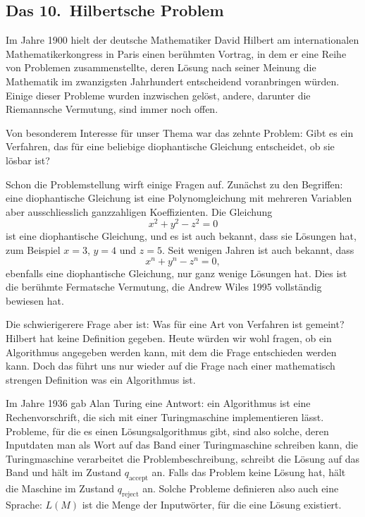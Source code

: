 \subsection{Das 10.~Hilbertsche Problem}
%
%
Im Jahre 1900 hielt der deutsche Mathematiker David Hilbert am
%
internationalen Mathematikerkongress in Paris einen berühmten Vortrag,
in dem er eine Reihe von Problemen zusammenstellte, deren Lösung
nach seiner Meinung die Mathematik im zwanzigsten Jahrhundert
entscheidend voranbringen würden. Einige dieser Probleme wurden
inzwischen gelöst, andere, darunter die Riemannsche Vermutung,
sind immer noch offen.

Von besonderem Interesse für unser Thema war das zehnte Problem:
Gibt es ein Verfahren, das für eine beliebige diophantische Gleichung
entscheidet, ob sie lösbar ist?

Schon die Problemstellung wirft einige Fragen auf.
Zunächst zu den Begriffen:
%
eine diophantische Gleichung ist eine
Polynomgleichung mit mehreren Variablen aber ausschliesslich
ganzzahligen Koeffizienten. Die Gleichung
\[
x^2+y^2-z^2=0
\]
ist eine diophantische Gleichung, und es ist auch bekannt, dass sie
Lösungen hat, zum Beispiel $x=3$, $y=4$ und $z=5$. Seit wenigen
Jahren ist auch bekannt, dass
\[
x^n+y^n-z^n=0,
\]
ebenfalls eine diophantische Gleichung, nur ganz wenige Lösungen hat.
Dies ist die berühmte Fermatsche Vermutung, die Andrew Wiles 1995
%
%
vollständig bewiesen hat.

Die schwierigerere Frage aber ist: Was für eine Art von Verfahren
ist gemeint? Hilbert hat keine Definition gegeben. Heute würden
wir wohl fragen, ob ein Algorithmus angegeben werden kann, mit dem
die Frage entschieden werden kann. Doch das führt uns nur wieder
auf die Frage nach einer  mathematisch strengen Definition was
ein Algorithmus ist.

%
Im Jahre 1936 gab Alan Turing eine Antwort: ein Algorithmus ist eine
Rechenvorschrift, die sich mit einer Turingmaschine implementieren
lässt. Probleme, für die es einen Lösungsalgorithmus gibt, sind
also solche, deren Inputdaten man als Wort auf das Band einer
Turingmaschine schreiben kann, die Turingmaschine verarbeitet die
Problembeschreibung, schreibt die Lösung auf das Band und hält im
Zustand $q_{\text{accept}}$ an. Falls das Problem keine Lösung hat,
hält die Maschine im Zustand $q_{\text{reject}}$ an. Solche
Probleme definieren also auch eine Sprache: $L(M)$ ist die
Menge der Inputwörter, für die eine Lösung existiert.

